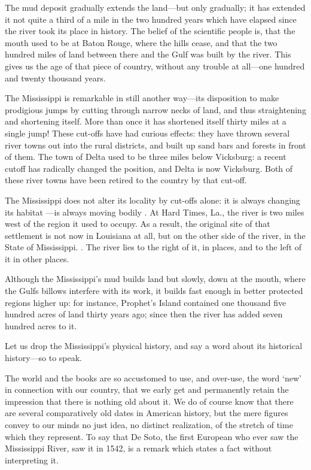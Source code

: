 \documentclass{novelette}
\begin{document}
The mud deposit gradually extends the land---but only gradually; it has
extended it not quite a third of a mile in the two hundred years which
have elapsed since the river took its place in history. The belief of
the scientific people is, that the mouth used to be at Baton Rouge,
where the hills cease, and that the two hundred miles of land between
there and the Gulf was built by the river. This gives us the age of that
piece of country, without any trouble at all---one hundred and twenty
thousand years.

The Mississippi is remarkable in still another way---its disposition to
make prodigious jumps by cutting through narrow necks of land, and thus
straightening and shortening itself. More than once it has shortened
itself thirty miles at a single jump! These cut-offs have had curious
effects: they have thrown several river towns out into the rural
districts, and built up sand bars and forests in front of them. The town
of Delta used to be three miles below Vicksburg: a recent cutoff has
radically changed the position, and Delta is now 
Vicksburg. Both of these river towns have been retired to the country by that
cut-off.

The Mississippi does not alter its locality by cut-offs alone: it
is always changing its habitat ---is always moving bodily
. At Hard Times, La., the river is two miles west of the
region it used to occupy. As a result, the original site of that
settlement is not now in Louisiana at all, but on the other side of
the river, in the State of Mississippi. . The river lies to the right of it, in places, and to the
left of it in other places.

Although the Mississippi's mud builds land but slowly, down at the
mouth, where the Gulfs billows interfere with its work, it builds fast
enough in better protected regions higher up: for instance, Prophet's
Island contained one thousand five hundred acres of land thirty years
ago; since then the river has added seven hundred acres to it.


Let us drop the Mississippi's physical history, and say a word about its
historical history---so to speak.

The world and the books are so accustomed to use, and over-use, the word
`new' in connection with our country, that we early get and permanently
retain the impression that there is nothing old about it. We do of
course know that there are several comparatively old dates in American
history, but the mere figures convey to our minds no just idea, no
distinct realization, of the stretch of time which they represent.
To say that De Soto, the first European who ever saw the Mississippi
River, saw it in 1542, is a remark which states a fact without
interpreting it.
\end{document}
